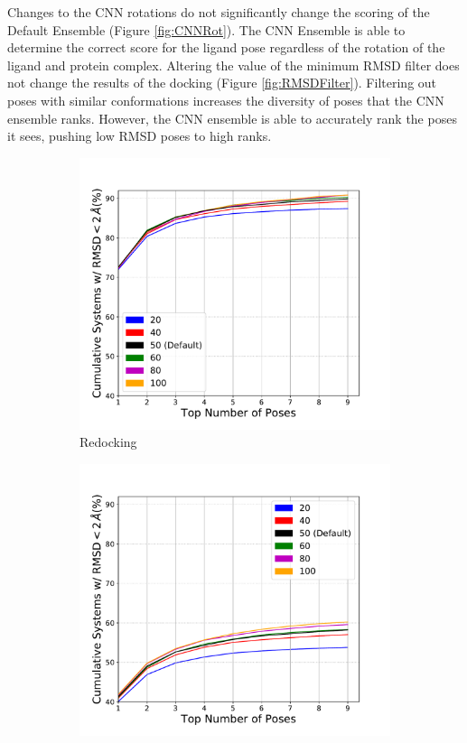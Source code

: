 \documentclass[journal=jcisd8,manuscript=article]{achemso}
\begin{document}
Changes to the CNN rotations do not significantly change the scoring of the Default Ensemble (Figure \ref{fig:CNNRot}). The CNN Ensemble is able to determine the correct score for the ligand pose regardless of the rotation of the ligand and protein complex. Altering the value of the minimum RMSD filter does not change the results of the docking (Figure \ref{fig:RMSDFilter}).  Filtering out poses with similar conformations increases the diversity of poses that the CNN ensemble ranks. However, the CNN ensemble is able to accurately rank the poses it sees, pushing low RMSD poses to high ranks.

\begin{figure}    
        \begin{subfigure}[b]{0.48\textwidth}    
		\centering
		\includegraphics[width=\textwidth]{figures/redocking/sweep_mcsaved_line.pdf}
		\caption{Redocking}
		\label{fig:mcsaved rd}
        \end{subfigure}    
        \begin{subfigure}[b]{0.48\textwidth}    
		\centering
		\includegraphics[width=\textwidth]{figures/crossdocking/sweep_mcsaved_line.pdf}

\end{subfigure}
\end{figure}
\end{document}
